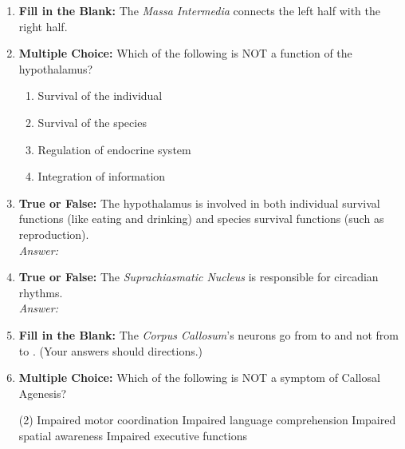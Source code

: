 \begin{enumerate}[label=\textbf{Q1.10.\arabic*}]
      \item \textbf{Fill in the Blank:} The \textit{Massa Intermedia} connects the left \underline{\hspace{3cm}} half with the right half. \\

      \item \textbf{Multiple Choice:} Which of the following is NOT a function of the hypothalamus?
            \begin{enumerate}[label=(\Alph*)]
                  \item Survival of the individual
                  \item Survival of the species
                  \item Regulation of endocrine system
                  \item Integration of information
            \end{enumerate}



      \item \textbf{True or False:} The hypothalamus is involved in both individual survival functions (like eating and drinking) and species survival functions (such as reproduction). \\
            \textit{Answer:} %


      \item \textbf{True or False:} The \textit{Suprachiasmatic Nucleus} is responsible for circadian rhythms. \\
            \textit{Answer:} %

      

      \item \textbf{Fill in the Blank:} The \textit{Corpus Callosum}'s neurons go from \underline{\hspace{3cm}} to \underline{\hspace{3cm}} and not from \underline{\hspace{3cm}} to \underline{\hspace{3cm}}. (Your answers should directions.) \\

      \item \textbf{Multiple Choice:} Which of the following is NOT a symptom of Callosal Agenesis?
            \begin{tasks}[label=(\Alph*), label-width=1.5em, item-indent=1.7em](2) %
                  \task Impaired motor coordination
                  \task Impaired language comprehension
                  \task Impaired spatial awareness
                  \task Impaired executive functions
            \end{tasks}


\end{enumerate}
